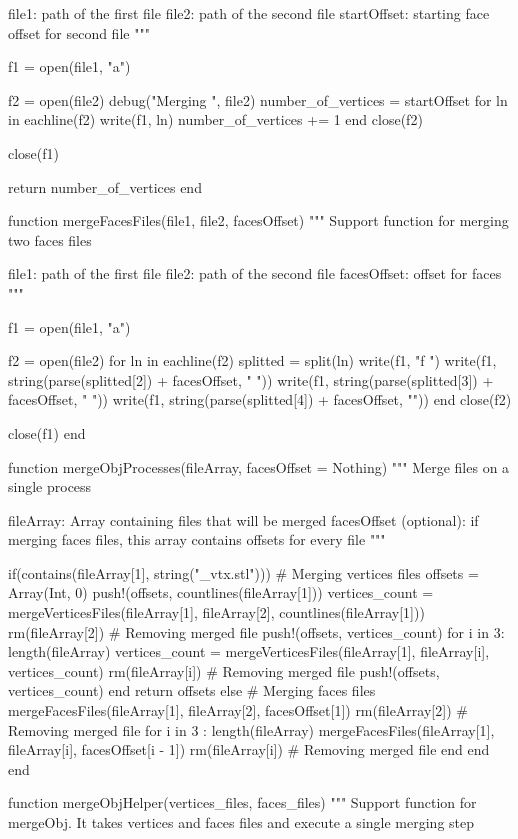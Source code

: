 \documentclass[11pt,oneside]{article}	%
\begin{document}
{  file1: path of the first file
  file2: path of the second file
  startOffset: starting face offset for second file
  """

  f1 = open(file1, "a")

  f2 = open(file2)
  debug("Merging ", file2)
  number_of_vertices = startOffset
  for ln in eachline(f2)
    write(f1, ln)
    number_of_vertices += 1
  end
  close(f2)

  close(f1)

  return number_of_vertices
end


function mergeFacesFiles(file1, file2, facesOffset)
  """
  Support function for merging two faces files

  file1: path of the first file
  file2: path of the second file
  facesOffset: offset for faces
  """

  f1 = open(file1, "a")

  f2 = open(file2)
  for ln in eachline(f2)
    splitted = split(ln)
    write(f1, "f ")
    write(f1, string(parse(splitted[2]) + facesOffset, " "))
    write(f1, string(parse(splitted[3]) + facesOffset, " "))
    write(f1, string(parse(splitted[4]) + facesOffset, "\n"))
  end
  close(f2)

  close(f1)
end

function mergeObjProcesses(fileArray, facesOffset = Nothing)
  """
  Merge files on a single process

  fileArray: Array containing files that will be merged
  facesOffset (optional): if merging faces files, this array contains
    offsets for every file
  """

  if(contains(fileArray[1], string("_vtx.stl")))
    # Merging vertices files
    offsets = Array(Int, 0)
    push!(offsets, countlines(fileArray[1]))
    vertices_count = mergeVerticesFiles(fileArray[1], fileArray[2], countlines(fileArray[1]))
    rm(fileArray[2]) # Removing merged file
    push!(offsets, vertices_count)
    for i in 3: length(fileArray)
      vertices_count = mergeVerticesFiles(fileArray[1], fileArray[i], vertices_count)
      rm(fileArray[i]) # Removing merged file
      push!(offsets, vertices_count)
    end
    return offsets
  else
    # Merging faces files
    mergeFacesFiles(fileArray[1], fileArray[2], facesOffset[1])
    rm(fileArray[2]) # Removing merged file
    for i in 3 : length(fileArray)
      mergeFacesFiles(fileArray[1], fileArray[i], facesOffset[i - 1])
      rm(fileArray[i]) # Removing merged file
    end
  end
end

function mergeObjHelper(vertices_files, faces_files)
  """
  Support function for mergeObj. It takes vertices and faces files
  and execute a single merging step

}
\end{document}
